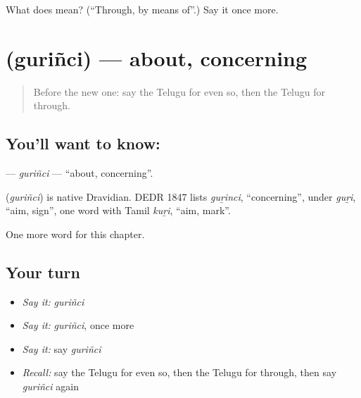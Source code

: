 \begin{tcolorbox}[breakable,colback=teal!4,colframe=teal!35!black,title={Before you move on}]
What does  mean? (\textquotedblleft{}Through, by means of\textquotedblright{}.) Say it once more.
\end{tcolorbox}
\section[\texorpdfstring{\te{గురించి} (guriñci)}{గురించి (guriñci)}]{ (guriñci) — about, concerning}

\label{lesson:TE-C176-gurinci}



\begin{quote}
Before the new one: say the Telugu for even so, then the Telugu for through.
\end{quote}

\subsection*{You'll want to know: }
\textbf{} — \emph{guriñci} — \textquotedblleft{}about, concerning\textquotedblright{}.

\begin{cousinweb}
\textbf{} (\emph{guriñci}) is native Dravidian. DEDR 1847 lists \emph{guṟinci}, \textquotedblleft{}concerning\textquotedblright{}, under \emph{guṟi}, \textquotedblleft{}aim, sign\textquotedblright{}, one word with Tamil \emph{kuṟi}, \textquotedblleft{}aim, mark\textquotedblright{}.
\end{cousinweb}

\begin{grammarlens}[title={What you've built}]
One more word for this chapter.
\end{grammarlens}

\subsection*{Your turn}
\begin{itemize}
\raggedright
  \item \emph{Say it:} \emph{guriñci}
  \item \emph{Say it:} \emph{guriñci}, once more
  \item \emph{Say it:} say \emph{guriñci}
  \item \emph{Recall:} say the Telugu for even so, then the Telugu for through, then say \emph{guriñci} again
\end{itemize}

